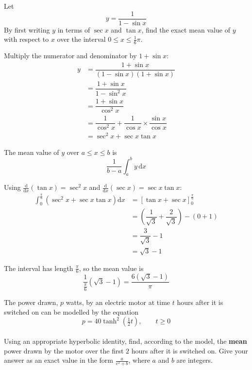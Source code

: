 \documentclass[leqno]{article}
\begin{document}
\begin{enumerate}[
  label=\textbf{\arabic*.},
  leftmargin=*,
  topsep=0pt,
  partopsep=0pt,
  parsep=0pt
]
\newpage

\questionitem

Let
\[y = \dfrac{1}{1 - \sin x}\]
By first writing $y$ in terms of $\sec x$ and $\tan x$, find the exact mean value of $y$ with respect to $x$ over the interval $0 \le x \le \frac{1}{6}\pi$.  \\

\vspace*{10pt}

\begin{djsSolution}
Multiply the numerator and denominator by \(1+\sin x\):
\begin{align*}
y&=\dfrac{1+\sin x}{(1-\sin x)(1+\sin x)}\\
&=\dfrac{1+\sin x}{1-\sin^2 x}\\
&=\dfrac{1+\sin x}{\cos^2 x}\\
&=\dfrac{1}{\cos^2 x}+\dfrac{1}{\cos x}\times\dfrac{\sin x}{\cos x}\\
&=\sec^2 x+\sec x\tan x
\end{align*}

The mean value of \(y\) over \(a\le x\le b\) is
\[
\dfrac{1}{b-a}\int_a^b y\,\mathrm{d}x
\]

Using \(\frac{\mathrm{d}}{\mathrm{d}x}(\tan x)=\sec^2 x\) and \(\frac{\mathrm{d}}{\mathrm{d}x}(\sec x)=\sec x\tan x\):
\begin{align*}
\int_0^{\frac{\pi}{6}}\left(\sec^2 x+\sec x\tan x\right)\mathrm{d}x&=\left[\tan x+\sec x\right]_0^{\frac{\pi}{6}}\\
&=\left(\dfrac{1}{\sqrt{3}}+\dfrac{2}{\sqrt{3}}\right)-(0+1)\\
&=\dfrac{3}{\sqrt{3}}-1\\
&=\sqrt{3}-1
\end{align*}

The interval has length \(\frac{\pi}{6}\), so the mean value is
\[
\dfrac{1}{\frac{\pi}{6}}\left(\sqrt{3}-1\right)=\dfrac{6\left(\sqrt{3}-1\right)}{\pi}
\]
\end{djsSolution}

\newpage

\questionitem

The power drawn, $p$ watts, by an electric motor at time $t$ hours after it is switched on can be modelled by the equation
\[p = 40\tanh^2\left(\tfrac{1}{2}t\right), \qquad t \ge 0\] \\
Using an appropriate hyperbolic identity, find, according to the model, the \textbf{mean} power drawn by the motor over the first $2$ hours after it is switched on. Give your answer as an exact value in the form $\frac{a}{e^2+b}$, where $a$ and $b$ are integers.  \\


\end{enumerate}
\end{document}
